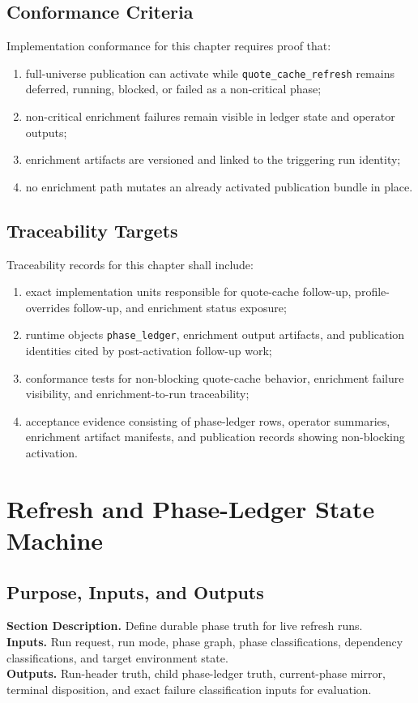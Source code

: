 \documentclass[11pt]{report}
\newcommand{\meta}[3]{\textbf{Section Description.} #1\\
\textbf{Inputs.} #2\\
\textbf{Outputs.} #3\par}
\begin{document}
\section{Conformance Criteria}
Implementation conformance for this chapter requires proof that:
\begin{enumerate}[leftmargin=1.2cm]
    \item full-universe publication can activate while \texttt{quote\_cache\_refresh} remains deferred, running, blocked, or failed as a non-critical phase;
    \item non-critical enrichment failures remain visible in ledger state and operator outputs;
    \item enrichment artifacts are versioned and linked to the triggering run identity;
    \item no enrichment path mutates an already activated publication bundle in place.
\end{enumerate}

\section{Traceability Targets}
Traceability records for this chapter shall include:
\begin{enumerate}[leftmargin=1.2cm]
    \item exact implementation units responsible for quote-cache follow-up, profile-overrides follow-up, and enrichment status exposure;
    \item runtime objects \texttt{phase\_ledger}, enrichment output artifacts, and publication identities cited by post-activation follow-up work;
    \item conformance tests for non-blocking quote-cache behavior, enrichment failure visibility, and enrichment-to-run traceability;
    \item acceptance evidence consisting of phase-ledger rows, operator summaries, enrichment artifact manifests, and publication records showing non-blocking activation.
\end{enumerate}

\chapter{Refresh and Phase-Ledger State Machine}
\section{Purpose, Inputs, and Outputs}
\meta{Define durable phase truth for live refresh runs.}{Run request, run mode, phase graph, phase classifications, dependency classifications, and target environment state.}{Run-header truth, child phase-ledger truth, current-phase mirror, terminal disposition, and exact failure classification inputs for evaluation.}
\end{document}
